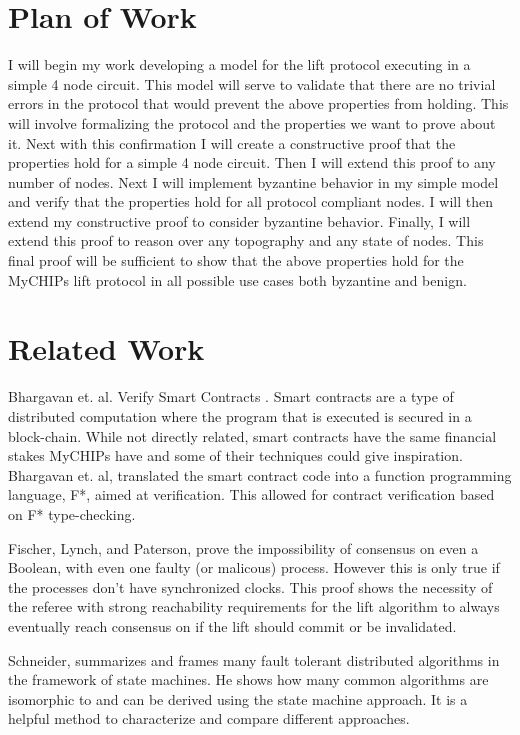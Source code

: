 \documentclass[article, onecolumn, 12pt]{IEEEtran}
\begin{document}
\section{Plan of Work}
I will begin my work developing a model for the lift protocol executing in a simple 4 node circuit. This model will serve to validate that there are no trivial errors in the protocol that would prevent the above properties from holding. This will involve formalizing the protocol and the properties we want to prove about it. Next with this confirmation I will create a constructive proof that the properties hold for a simple 4 node circuit. Then I will extend this proof to any number of nodes. Next I will implement byzantine behavior in my simple model and verify that the properties hold for all protocol compliant nodes. I will then extend my constructive proof to consider byzantine behavior. Finally, I will extend this proof to reason over any topography and any state of nodes. This final proof will be sufficient to show that the above properties hold for the MyCHIPs lift protocol in all possible use cases both byzantine and benign.

\section{Related Work}
 Bhargavan et. al. Verify Smart Contracts \cite{SmartContracts}. Smart contracts are a type of distributed computation where the program that is executed is secured in a block-chain. While not directly related, smart contracts have the same financial stakes MyCHIPs have and some of their techniques could give inspiration.  Bhargavan et. al, translated the smart contract code into a function programming language, F*, aimed at verification. This allowed for contract verification based on F* type-checking.
 
 
 Fischer, Lynch, and Paterson,\cite{Fischer} prove the impossibility of consensus on even a Boolean, with even one faulty (or malicous) process. However this is only true if the processes don't have synchronized clocks. This proof shows the necessity of the referee with strong reachability requirements for the lift algorithm to always eventually reach consensus on if the lift should commit or be invalidated.
 
 
 Schneider, summarizes and frames many fault tolerant distributed algorithms in the framework of state machines\cite{StateMachine}. He shows how many common algorithms are isomorphic to and can be derived using the state machine approach. It is a helpful method to characterize and compare different approaches.
 
\end{document}
